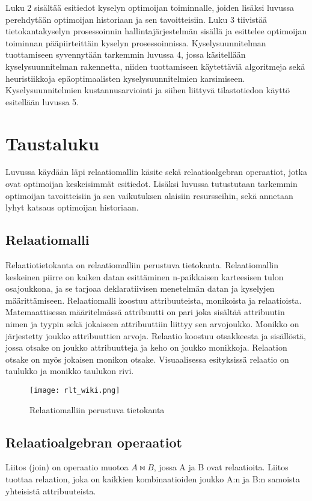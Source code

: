 \documentclass[finnish]{tktltiki2}
\theoremstyle{definition}
\theoremstyle{remark}
\begin{document}
Luku 2 sisältää esitiedot kyselyn optimoijan toiminnalle, joiden lisäksi luvussa perehdytään optimoijan historiaan ja sen tavoitteisiin. Luku 3 tiivistää tietokantakyselyn prosessoinnin hallintajärjestelmän sisällä ja esittelee optimoijan toiminnan pääpiirteittäin kyselyn prosessoinnissa. Kyselysuunnitelman tuottamiseen syvennytään tarkemmin luvussa 4, jossa käsitellään kyselysuunnitelman rakennetta, niiden tuottamiseen käytettäviä algoritmeja sekä heuristiikkoja epäoptimaalisten kyselysuunnitelmien karsimiseen. Kyselysuunnitelmien kustannusarviointi ja siihen liittyvä tilastotiedon käyttö esitellään luvussa 5. 

\section{Taustaluku}
Luvussa käydään läpi relaatiomallin käsite sekä relaatioalgebran operaatiot, jotka ovat optimoijan keskeisimmät esitiedot. Lisäksi luvussa tutustutaan tarkemmin optimoijan tavoitteisiin ja sen vaikutuksen alaisiin resursseihin, sekä annetaan lyhyt katsaus optimoijan historiaan.
\subsection{Relaatiomalli}
Relaatiotietokanta on relaatiomalliin \cite{codd1970relational} perustuva tietokanta. Relaatiomallin keskeinen piirre on kaiken datan esittäminen n-paikkaisen karteesisen tulon osajoukkona, ja se tarjoaa deklaratiivisen menetelmän datan ja kyselyjen määrittämiseen. Relaatiomalli koostuu attribuuteista, monikoista ja relaatioista. Matemaattisessa määritelmässä attribuutti on pari joka sisältää attribuutin nimen ja tyypin sekä jokaiseen attribuuttiin liittyy sen arvojoukko. Monikko on järjestetty joukko attribuuttien arvoja. Relaatio koostuu otsakkeesta ja sisällöstä, jossa otsake on joukko attribuutteja ja keho on joukko monikkoja. Relaation otsake on myös jokaisen monikon otsake. Visuaalisessa esityksissä relaatio on taulukko ja monikko taulukon rivi. 

\begin{figure}[!h]
  \caption{Relaatiomalliin perustuva tietokanta}
  \centering
    \texttt{[image: rlt\_wiki.png]}
\end{figure}

\subsection{Relaatioalgebran operaatiot}
Liitos (join) on operaatio muotoa $A\bowtie B$, jossa A ja B ovat relaatioita. Liitos tuottaa relaation, joka on kaikkien kombinaatioiden joukko A:n ja B:n samoista yhteisistä attribuuteista.
\end{document}
